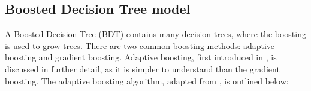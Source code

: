 


\subsection{Boosted Decision Tree model}
\label{sec:analysisBDT}

A Boosted Decision Tree (BDT) contains many decision trees, where the boosting is used to grow trees. There are two common boosting methods: adaptive boosting and gradient boosting. Adaptive boosting,  first introduced in \cite{FREUND1997119}, is discussed in further detail, as it is simpler to understand than the gradient boosting. The adaptive boosting algorithm, adapted from \cite{hastie2009elements},  is outlined below:

